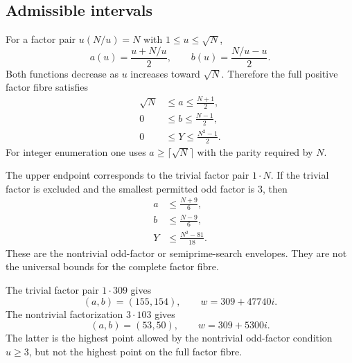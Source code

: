 \subsection{Admissible intervals}

For a factor pair $u(N/u)=N$ with $1\le u\le\sqrt N$,
\begin{equation}
 a(u)=\frac{u+N/u}{2},
 \qquad
 b(u)=\frac{N/u-u}{2}.
 \label{eq:ab-u}
\end{equation}
Both functions decrease as $u$ increases toward $\sqrt N$.  Therefore the full positive factor fibre satisfies
\begin{align}
 \sqrt N&\le a\le\frac{N+1}{2},
 \label{eq:a-full-range}\\
 0&\le b\le\frac{N-1}{2},
 \label{eq:b-full-range}\\
 0&\le Y\le\frac{N^2-1}{2}.
 \label{eq:Y-full-range}
\end{align}
For integer enumeration one uses $a\ge\lceil\sqrt N\rceil$ with the parity required by $N$.

The upper endpoint corresponds to the trivial factor pair $1\cdot N$.  If the trivial factor is excluded and the smallest permitted odd factor is $3$, then
\begin{align}
 a&\le\frac{N+9}{6},
 \label{eq:a-three}\\
 b&\le\frac{N-9}{6},
 \label{eq:b-three}\\
 Y&\le\frac{N^2-81}{18}.
 \label{eq:Y-three}
\end{align}
These are the nontrivial odd-factor or semiprime-search envelopes.  They are not the universal bounds for the complete factor fibre.

\begin{example}[The fibre $N=309$]
The trivial factor pair $1\cdot309$ gives
\[
 (a,b)=(155,154),
 \qquad
 w=309+47740i.
\]
The nontrivial factorization $3\cdot103$ gives
\[
 (a,b)=(53,50),
 \qquad
 w=309+5300i.
\]
The latter is the highest point allowed by the nontrivial odd-factor condition $u\ge3$, but not the highest point on the full factor fibre.
\end{example}

